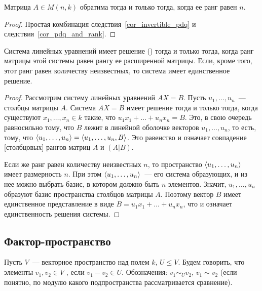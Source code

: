 \begin{corollary}\label{cor_invertibility_rank}
Матрица $A\in M(n,k)$ обратима тогда и только тогда, когда ее ранг
равен $n$.
\end{corollary}
\begin{proof}
Простая комбинация следствия~\ref{cor_invertible_pdq} и
следствия~\ref{cor_pdq_and_rank}.
\end{proof}

\begin{theorem}
Система линейных уравнений имеет решение
() тогда и
только тогда, когда ранг матрицы этой системы равен рангу ее
расширенной матрицы. Если, кроме того, этот ранг равен количеству
неизвестных, то система имеет единственное решение.
\end{theorem}
\begin{proof}
Рассмотрим систему линейных уравнений $AX=B$.
Пусть $u_1,\dots,u_n$~--- столбцы матрицы $A$.
Система $AX=B$ имеет решение тогда и только тогда, когда существуют
$x_1,\dots,x_n\in k$ такие, что $u_1x_1+\dots+u_nx_n=B$. Это, в свою
очередь равносильно тому, что $B$ лежит в линейной оболочке векторов
$u_1,\dots,u_n$, то есть, тому, что $\langle u_1,\dots,u_n\rangle =
\langle u_1,\dots,u_n,B\rangle$. Это равенство и означает совпадение
[столбцовых] рангов матриц $A$ и $(A|B)$.

Если же ранг равен количеству неизвестных $n$, то пространство $\langle
u_1,\dots,u_n\rangle$ имеет размерность $n$. При этом $\langle
u_1,\dots,u_n\rangle$~--- его система образующих, и из нее можно выбрать
базис, в котором должно быть $n$ элементов. Значит, $u_1,\dots,u_n$
образуют базис пространства столбцов матрицы $A$. Поэтому вектор $B$
имеет единственное представление в виде $B=u_1x_1+\dots+u_nx_n$, что и
означает единственность решения системы.
\end{proof}



\subsection{Фактор-пространство}


\begin{definition}\label{def:quotient_space}
Пусть $V$~--- векторное пространство над полем $k$, $U\leq V$. Будем
говорить, что элементы $v_1,v_2\in V$ ,
если $v_1-v_2\in U$. Обозначения: $v_1\sim_U v_2$, $v_1\sim v_2$ (если
понятно, по модулю какого подпространства рассматривается сравнение).
\end{definition}

